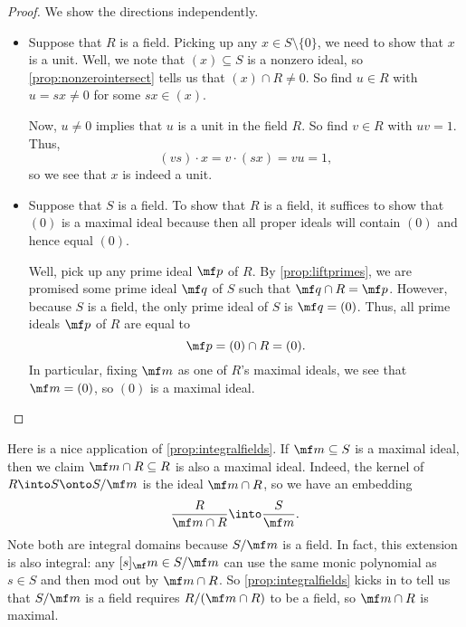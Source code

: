 \begin{proof}
	We show the directions independently.
	\begin{itemize}
		\item Suppose that $R$ is a field. Picking up any $x\in S\setminus\{0\}$, we need to show that $x$ is a unit. Well, we note that $(x)\subseteq S$ is a nonzero ideal, so \autoref{prop:nonzerointersect} tells us that $(x)\cap R\ne0$. So find $u\in R$ with $u=sx\ne0$ for some $sx\in(x)$.

		Now, $u\ne0$ implies that $u$ is a unit in the field $R$. So find $v\in R$ with $uv=1$. Thus,
		\[(vs)\cdot x=v\cdot(sx)=vu=1,\]
		so we see that $x$ is indeed a unit.

		\item Suppose that $S$ is a field. To show that $R$ is a field, it suffices to show that $(0)$ is a maximal ideal because then all proper ideals will contain $(0)$ and hence equal $(0)$.
		
		Well, pick up any prime ideal $\mf p$ of $R$. By \autoref{prop:liftprimes}, we are promised some prime ideal $\mf q$ of $S$ such that $\mf q\cap R=\mf p$. However, because $S$ is a field, the only prime ideal of $S$ is $\mf q=(0)$. Thus, all prime ideals $\mf p$ of $R$ are equal to
		\[\mf p=(0)\cap R=(0).\]
		In particular, fixing $\mf m$ as one of $R$'s maximal ideals, we see that $\mf m=(0)$, so $(0)$ is a maximal ideal.
		\qedhere
	\end{itemize}
\end{proof}
\begin{remark}[Nir] \label{rem:goingdownmax}
	Here is a nice application of \autoref{prop:integralfields}. If $\mf m\subseteq S$ is a maximal ideal, then we claim $\mf m\cap R\subseteq R$ is also a maximal ideal. Indeed, the kernel of $R\into S\onto S/\mf m$ is the ideal $\mf m\cap R$, so we have an embedding
	\[\frac R{\mf m\cap R}\into\frac S{\mf m}.\]
	Note both are integral domains because $S/\mf m$ is a field. In fact, this extension is also integral: any $[s]_\mf m\in S/\mf m$ can use the same monic polynomial as $s\in S$ and then mod out by $\mf m\cap R$. So \autoref{prop:integralfields} kicks in to tell us that $S/\mf m$ is a field requires $R/(\mf m\cap R)$ to be a field, so $\mf m\cap R$ is maximal.
\end{remark}